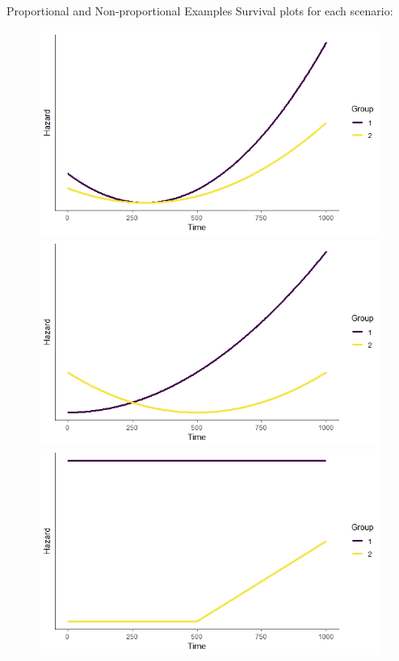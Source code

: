 \documentclass[10pt,t]{beamer}
\begin{document}
\begin{frame}{Proportional and Non-proportional Examples}
	\vspace{-5 mm}
	Survival plots for each scenario:
	
	\begin{figure}
		\centering
		\includegraphics[scale = 0.15]{figs/prop_hazard_1}
		\includegraphics[scale = 0.15]{figs/nonprop_hazard_2}
		\includegraphics[scale = 0.15]{figs/nonprop_hazard_1}

\end{figure}
\end{frame}
\end{document}

